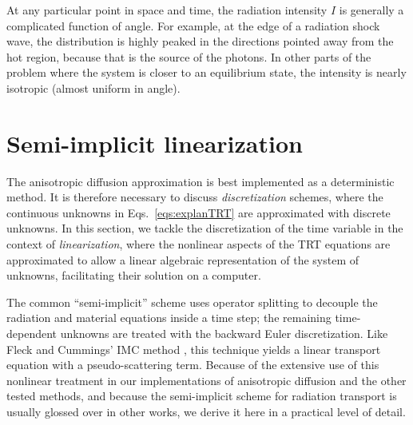 At any particular point in space and time, the radiation intensity $I$ is
generally a complicated function of angle.%
For example, at the edge of a
radiation shock wave, the distribution is highly peaked in the directions
pointed away from the hot region, because that is the source of the photons. In
other parts of the problem where the system is closer to an equilibrium state,
the intensity is nearly isotropic (almost uniform in angle).

\section{Semi-implicit linearization}\label{sec:bgSemiImplicit}

The anisotropic diffusion approximation is best implemented as a deterministic
method. It is
therefore necessary to discuss \emph{discretization} schemes,
where the continuous unknowns in Eqs.~\eqref{eqs:explanTRT} are approximated
with discrete unknowns. In this section, we tackle the discretization of the
time variable in the context of \emph{linearization}, where the nonlinear
aspects of the TRT equations are approximated to allow a linear algebraic
representation of the system of unknowns, facilitating their solution on a
computer.

The common
``semi-implicit'' scheme \cite{Kno1999a,Kno2001,Low2004} uses operator splitting
to decouple the radiation and material equations inside a time step; the
remaining time-dependent unknowns are treated with the backward Euler
discretization.
Like Fleck and Cummings' IMC method \cite{Fle1971}, this technique
yields a linear transport equation with a pseudo-scattering term. Because of the
extensive use of this
nonlinear treatment in our implementations of anisotropic diffusion and the
other tested methods, and because the semi-implicit scheme for radiation
transport is usually glossed over in other works, we derive
it here in a practical level of detail.

